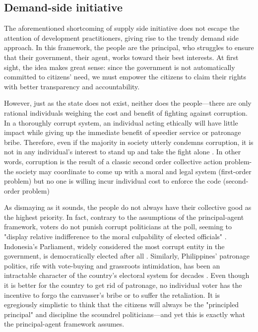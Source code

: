 \documentclass[12pt]{article}
\begin{document}
\subsection{Demand-side initiative}
\label{sec:demandside}

The aforementioned shortcoming of supply side initiative does not escape the attention of development practitioners, giving rise to the trendy demand side approach. In this framework, the people are the principal, who struggles to ensure that their government, their agent, works toward their best interests. At first sight, the idea makes great sense: since the government is not automatically committed to citizens' need, we must empower the citizens to claim their rights with better transparency and accountability.

However, just as the state does not exist, neither does the people---there are only rational individuals weighing the cost and benefit of fighting against corruption. In a thoroughly corrupt system, an individual acting ethically will have little impact while giving up the immediate benefit of speedier service or patronage bribe. Therefore, even if the majority in society utterly condemns corruption, it is not in any individual's interest to stand up and take the fight alone \citep{Persson2010}. In other words, corruption is the result of a classic second order collective action problem-the society may coordinate to come up with a moral and legal system (first-order problem) but no one is willing incur individual cost to enforce the code (second-order problem) \citep{Heckathorn1989}

As dismaying as it sounds, the people do not always have their collective good as the highest priority. In fact, contrary to the assumptions of the principal-agent framework, voters do not punish corrupt politicians at the poll, seeming to "display relative indifference to the moral culpability of elected officials" \citep{Chang2007}. Indonesia's Parliament, widely considered the most corrupt entity in the government, is democratically elected after all \citep{Integrity2012a}. Similarly, Philippines' patronage politics, rife with vote-buying and grassroots intimidation, has been an intractable character of the country's electoral system for decades \citep{Sidel1999}. Even though it is better for the country to get rid of patronage, no individual voter has the incentive to forgo the canvasser's bribe or to suffer the retaliation. It is egregiously simplistic to think that the citizens will always be the "principled principal" and discipline the scoundrel politicians---and yet this is exactly what the principal-agent framework assumes.
\end{document}
